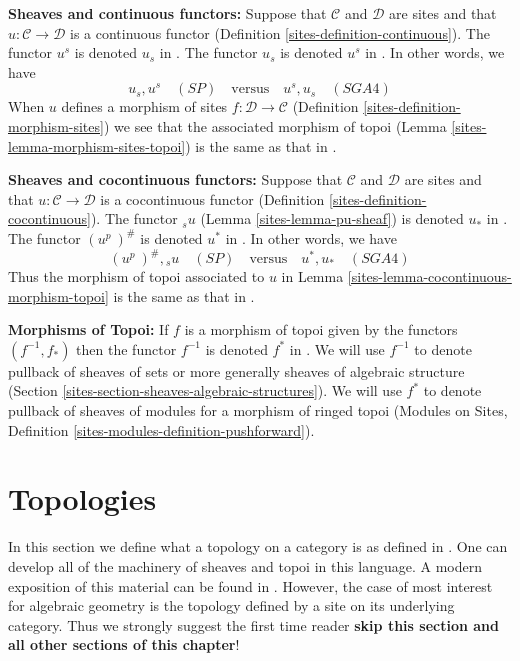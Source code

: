 \medskip\noindent
{\bf Sheaves and continuous functors:}
Suppose that $\mathcal{C}$ and $\mathcal{D}$ are sites and that
$u : \mathcal{C} \to \mathcal{D}$ is
a continuous functor (Definition \ref{sites-definition-continuous}).
The functor $u^s$ is denoted $u_s$ in \cite[Exposee III, 1.11]{SGA4}.
The functor $u_s$ is denoted $u^s$ in
\cite[Exposee III, Proposition 1.2]{SGA4}.
In other words, we have
$$
u_s, u^s\quad(SP)
\quad\text{versus}\quad
u^s, u_s\quad(SGA4)
$$
When $u$ defines a morphism of sites
$f : \mathcal{D} \to \mathcal{C}$
(Definition \ref{sites-definition-morphism-sites})
we see that the associated morphism of topoi
(Lemma \ref{sites-lemma-morphism-sites-topoi}) is the same as that in
\cite[Exposee IV, (4.9.1.1)]{SGA4}.

\medskip\noindent
{\bf Sheaves and cocontinuous functors:}
Suppose that $\mathcal{C}$ and $\mathcal{D}$ are sites and that
$u : \mathcal{C} \to \mathcal{D}$ is
a cocontinuous functor (Definition \ref{sites-definition-cocontinuous}).
The functor ${}_su$ (Lemma \ref{sites-lemma-pu-sheaf}) is denoted $u_*$ in
\cite[Exposee III, Proposition 2.3]{SGA4}.
The functor $(u^p\ )^\#$ is denoted $u^*$ in
\cite[Exposee III, Proposition 2.3]{SGA4}.
In other words, we have
$$
(u^p\ )^\#, {}_su\quad(SP)
\quad\text{versus}\quad
u^*, u_*\quad(SGA4)
$$
Thus the morphism of topoi associated to $u$ in
Lemma \ref{sites-lemma-cocontinuous-morphism-topoi}
is the same as that in \cite[Exposee IV, 4.7]{SGA4}.

\medskip\noindent
{\bf Morphisms of Topoi:} If $f$ is a morphism of topoi given
by the functors $(f^{-1}, f_*)$ then the functor $f^{-1}$
is denoted $f^*$ in \cite[Exposee IV, Definition 3.1]{SGA4}.
We will use $f^{-1}$ to denote pullback of sheaves of sets
or more generally sheaves of algebraic structure
(Section \ref{sites-section-sheaves-algebraic-structures}).
We will use $f^*$ to denote pullback of sheaves of modules
for a morphism of ringed topoi
(Modules on Sites, Definition \ref{sites-modules-definition-pushforward}).

\section{Topologies}
\label{sites-section-topologies}
In this section we define what a topology on a category is as
defined in \cite{SGA4}. One can develop all of the machinery of
sheaves and topoi in this language. A modern exposition of this material
can be found in \cite{KS}. However, the case of most interest for algebraic
geometry is the topology defined by a site on its underlying category.
Thus we strongly suggest the first time reader
{\bf skip this section and all other sections of this chapter}!

